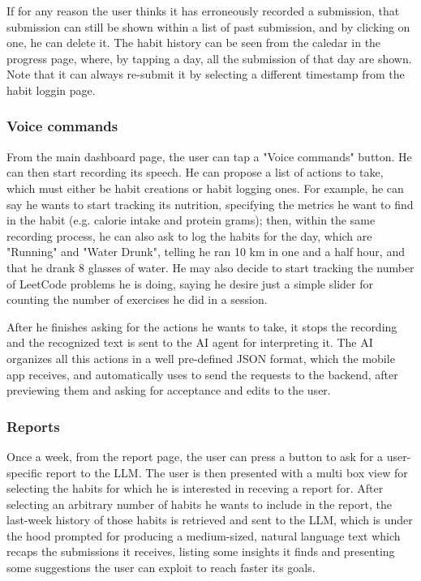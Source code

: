 \documentclass{article}
\begin{document}
If for any reason the user thinks it has erroneously recorded a submission, that submission can still be shown within a list of past submission, and by clicking on one, he can delete it.
The habit history can be seen from the caledar in the progress page, where, by tapping a day, all the submission of that day are shown.
Note that it can always re-submit it by selecting a different timestamp from the habit loggin page.

\subsubsection{Voice commands}

From the main dashboard page, the user can tap a "Voice commands" button.
He can then start recording its speech.
He can propose a list of actions to take, which must either be habit creations or habit logging ones.
For example, he can say he wants to start tracking its nutrition, specifying the metrics he want to find in the habit (e.g. calorie intake and protein grams); then, within the same recording process, he can also ask to log the habits for the day, which are "Running" and "Water Drunk", telling he ran 10 km in one and a half hour, and that he drank 8 glasses of water.
He may also decide to start tracking the number of LeetCode problems he is doing, saying he desire just a simple slider for counting the number of exercises he did in a session.

After he finishes asking for the actions he wants to take, it stops the recording and the recognized text is sent to the AI agent for interpreting it.
The AI organizes all this actions in a well pre-defined JSON format, which the mobile app receives, and automatically uses to send the requests to the backend, after previewing them and asking for acceptance and edits to the user.

\subsubsection{Reports}

Once a week, from the report page, the user can press a button to ask for a user-specific report to the LLM.
The user is then presented with a multi box view for selecting the habits for which he is interested in receving a report for.
After selecting an arbitrary number of habits he wants to include in the report, the last-week history of those habits is retrieved and sent to the LLM, which is under the hood prompted for producing a medium-sized, natural language text which recaps the submissions it receives, listing some insights it finds and presenting some suggestions the user can exploit to reach faster its goals.
\end{document}
